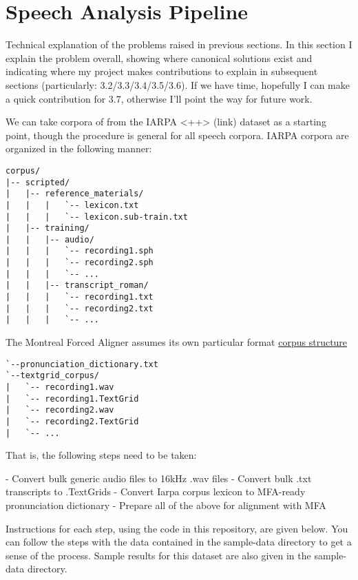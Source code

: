 \documentclass[11pt]{article}
\begin{document}
\section{Speech Analysis Pipeline}

Technical explanation of the problems raised in previous sections. In this section I explain the problem overall, showing where canonical solutions exist and indicating where my project makes contributions to explain in subsequent sections (particularly: 3.2/3.3/3.4/3.5/3.6). If we have time, hopefully I can make a quick contribution for 3.7, otherwise I'll point the way for future work.

We can take corpora of from the IARPA <++> (link) dataset as a starting point, though the procedure is general for all speech corpora. IARPA corpora are organized in the following manner:

\begin{verbatim}
corpus/
|-- scripted/
|   |-- reference_materials/
|   |   |   `-- lexicon.txt
|   |   |   `-- lexicon.sub-train.txt
|   |-- training/
|   |   |-- audio/
|   |   |   `-- recording1.sph
|   |   |   `-- recording2.sph
|   |   |   `-- ...
|   |   |-- transcript_roman/
|   |   |   `-- recording1.txt
|   |   |   `-- recording2.txt
|   |   |   `-- ...
\end{verbatim}

The Montreal Forced Aligner assumes its own particular format \href{https://montreal-forced-aligner.readthedocs.io/en/latest/user_guide/formats/corpus_structure.html}{corpus structure}

\begin{verbatim}
`--pronunciation_dictionary.txt
`--textgrid_corpus/
|   `-- recording1.wav
|   `-- recording1.TextGrid
|   `-- recording2.wav
|   `-- recording2.TextGrid
|   `-- ...
\end{verbatim}

That is, the following steps need to be taken:

- Convert bulk generic audio files to 16kHz .wav files
- Convert bulk .txt transcripts to .TextGrids
- Convert Iarpa corpus lexicon to MFA-ready pronunciation dictionary
- Prepare all of the above for alignment with MFA

Instructions for each step, using the code in this repository, are given below. You can follow the steps with the data contained in the sample-data directory to get a sense of the process. Sample results for this dataset are also given in the sample-data directory.
\end{document}
